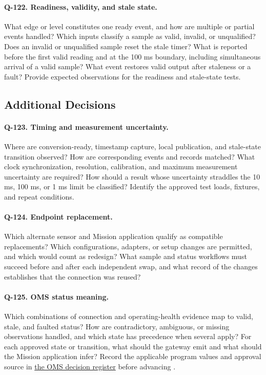 \paragraph{Q-122. Readiness, validity, and stale state.}\label{Question:Q-122}
What edge or level constitutes one ready event, and how are multiple or
partial events handled? Which inputs classify a sample as valid, invalid,
or unqualified? Does an invalid or unqualified sample reset the stale
timer? What is reported before the first valid reading and at the 100 ms
boundary, including simultaneous arrival of a valid sample? What event
restores valid output after staleness or a fault? Provide expected
observations for the readiness and stale-state tests.

\subsection{Additional Decisions}

\paragraph{Q-123. Timing and measurement uncertainty.}\label{Question:Q-123}
Where are conversion-ready, timestamp capture, local publication, and
stale-state transition observed? How are corresponding events and records
matched? What clock synchronization, resolution, calibration, and maximum
measurement uncertainty are required? How should a result whose uncertainty
straddles the 10 ms, 100 ms, or 1 ms limit be classified? Identify the
approved test loads, fixtures, and repeat conditions.

\paragraph{Q-124. Endpoint replacement.}\label{Question:Q-124}
Which alternate sensor and Mission application qualify as compatible
replacements? Which configurations, adapters, or setup changes are permitted,
and which would count as redesign? What sample and status workflows must
succeed before and after each independent swap, and what record of the
changes establishes that the connection was reused?

\paragraph{Q-125. OMS status meaning.}\label{Question:Q-125}
Which combinations of connection and operating-health evidence map to valid,
stale, and faulted status? How are contradictory, ambiguous, or missing
observations handled, and which state has precedence when several apply?
For each approved state or transition, what should the gateway emit and what
should the Mission application infer? Record the applicable program values
and approval source in \hyperref[Table:OMSStatusDecisions]{the OMS decision
register} before advancing .

